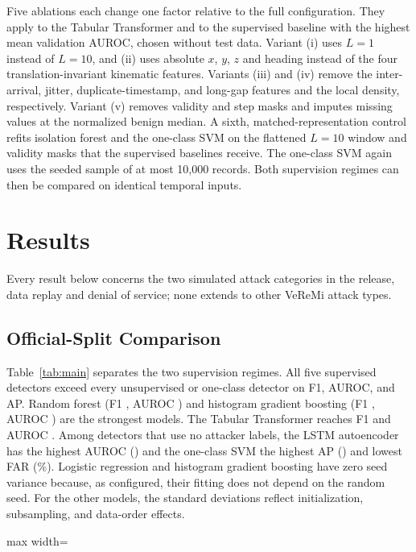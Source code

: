 \documentclass[preprint,12pt,numafflabel]{elsarticle}
\begin{document}
Five ablations each change one factor relative to the full configuration. They apply to the Tabular Transformer and to the supervised baseline with the highest mean validation AUROC, chosen without test data. Variant (i) uses $L=1$ instead of $L=10$, and (ii) uses absolute $x$, $y$, $z$ and heading instead of the four translation-invariant kinematic features. Variants (iii) and (iv) remove the inter-arrival, jitter, duplicate-timestamp, and long-gap features and the local density, respectively. Variant (v) removes validity and step masks and imputes missing values at the normalized benign median. A sixth, matched-representation control refits isolation forest and the one-class SVM on the flattened $L=10$ window and validity masks that the supervised baselines receive. The one-class SVM again uses the seeded sample of at most 10,000 records. Both supervision regimes can then be compared on identical temporal inputs.

\section{Results}
Every result below concerns the two simulated attack categories in the release, data replay and denial of service; none extends to other VeReMi attack types.

\subsection{Official-Split Comparison}
Table~\ref{tab:main} separates the two supervision regimes. All five supervised detectors exceed every unsupervised or one-class detector on F1, AUROC, and AP. Random forest (F1 \ResRandomForestFOne, AUROC \ResRandomForestAUROC) and histogram gradient boosting (F1 \ResHGBFOne, AUROC \ResHGBAUROC) are the strongest models. The Tabular Transformer reaches F1 \ResTabTransformerFOne{} and AUROC \ResTabTransformerAUROC. Among detectors that use no attacker labels, the LSTM autoencoder has the highest AUROC (\ResLSTMAEAUROC) and the one-class SVM the highest AP (\ResOneClassSVMAP) and lowest FAR (\ResOneClassSVMFAR\%). Logistic regression and histogram gradient boosting have zero seed variance because, as configured, their fitting does not depend on the random seed. For the other models, the standard deviations reflect initialization, subsampling, and data-order effects.

\begin{table}[!t]
\centering
\caption{Official VeReMi test split: mean $\pm$ sample standard deviation over \ResSeeds{} training seeds. Thresholds maximize validation F1. FAR is the alert rate on non-malicious records, not a work-zone FAR.}
\label{tab:main}
{\footnotesize
\begin{adjustbox}{max width=\textwidth}

\end{adjustbox}}
\end{table}
\end{document}
